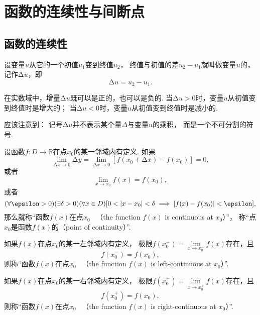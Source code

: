 \section{函数的连续性与间断点}\label{section:极限.函数的连续性与间断点}
\subsection{函数的连续性}
设变量\(u\)从它的一个初值\(u_1\)变到终值\(u_2\)，
终值与初值的差\(u_2 - u_1\)就叫做变量\(u\)的，
记作\(\increment u\)，即\[
	\increment u = u_2 - u_1.
\]

在实数域中，增量\(\increment u\)既可以是正的，也可以是负的.
当\(\increment u > 0\)时，变量\(u\)从初值变到终值时是增大的；
当\(\increment u < 0\)时，变量\(u\)从初值变到终值时是减小的.

应该注意到：
记号\(\increment u\)并不表示某个量\(\Delta\)与变量\(u\)的乘积，
而是一个不可分割的符号.

\begin{definition}\label{definition:极限.函数在一点的连续性}
设函数\(f\colon D\to\mathbb{R}\)在点\(x_0\)的某一邻域内有定义.
如果\[
	\lim\limits_{\increment x\to0} \increment y
	=\lim\limits_{\increment x\to0} [f(x_0 + \increment x)-f(x_0)]
	=0,
\]
或者\[
	\lim\limits_{x \to x_0} f(x) = f(x_0),
\]
或者\[
	(\forall \epsilon > 0)
	(\exists \delta > 0)
	(\forall x \in D)
	[
		0 < \abs{x - x_0} < \delta
		\implies
		\abs{f(x) - f(x_0)} < \epsilon
	],
\]
那么就称“函数\(f(x)\)在点\(x_0\)~
（the function \(f(x)\) is continuous at \(x_0\)）”，
称“点\(x_0\)是函数\(f(x)\)的（point of continuity）”.

如果\(f(x)\)在点\(x_0\)的某一左邻域内有定义，
极限\(f(x_0^-) = \lim\limits_{x \to x_0^-} f(x)\)存在，且\[
	f(x_0^-) = f(x_0),
\]
则称“函数\(f(x)\)在点\(x_0\)~
（the function \(f(x)\) is left-continuous at \(x_0\)）”.

如果\(f(x)\)在点\(x_0\)的某一右邻域内有定义，
极限\(f(x_0^+) = \lim\limits_{x \to x_0^+} f(x)\)存在，且\[
	f(x_0^+) = f(x_0),
\]
则称“函数\(f(x)\)在点\(x_0\)~
（the function \(f(x)\) is right-continuous at \(x_0\)）”.
\end{definition}

\begin{figure}[ht]
	\centering
	\def\fn(#1){ln(#1+3)*4-4}
	\caption{}
\end{figure}

